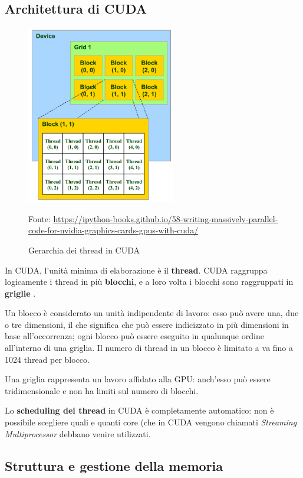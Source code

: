 \documentclass[12pt,a4paper,openright,twoside]{report}
\newcommand{\source}[1]{\caption*{\hfill \scriptsize Fonte: {#1}} }
\begin{document}
\subsection{Architettura di CUDA}

\begin{figure}[h]
    \centering
    \includegraphics[width=6.5cm]{grids-and-blocks.png}
    \source{\url{https://ipython-books.github.io/58-writing-massively-parallel-code-for-nvidia-graphics-cards-gpus-with-cuda/}}
    \caption{Gerarchia dei thread in CUDA}
    \label{img:grids-and-blocks}
\end{figure}

In CUDA, l'unità minima di elaborazione è il \textbf{thread}. CUDA raggruppa logicamente i thread in più \textbf{blocchi}, e a loro volta i blocchi sono raggruppati in \textbf{griglie} \cite{cudaguide}.

Un blocco è considerato un unità indipendente di lavoro: esso può avere una, due o tre dimensioni, il che significa che può essere indicizzato in più dimensioni in base all'occorrenza; ogni blocco può essere eseguito in qualunque ordine all'interno di una griglia. Il numero di thread in un blocco è limitato a va fino a 1024 thread per blocco.

Una griglia rappresenta un lavoro affidato alla GPU: anch'esso può essere tridimensionale e non ha limiti sul numero di blocchi.

Lo \textbf{scheduling dei thread} in CUDA è completamente automatico: non è possibile scegliere quali e quanti core (che in CUDA vengono chiamati \textit{Streaming Multiprocessor} debbano venire utilizzati.

\subsection{Struttura e gestione della memoria}
\end{document}
